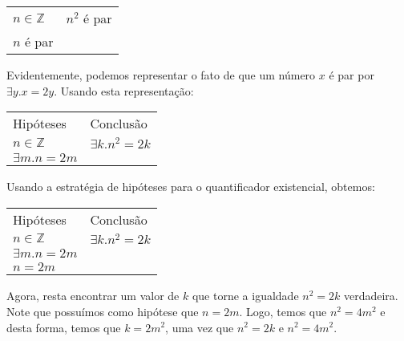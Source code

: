 \begin{Example}
\begin{flushleft}
\begin{tabular}{ll}
$n\in\mathbb{Z}$ & $n^2$ é par\\
$n$ é par  & \\
\end{tabular}
\end{flushleft}
Evidentemente, podemos representar o fato de que um número $x$ é par
por $\exists y. x = 2y$. Usando esta representação:
\begin{flushleft}
\begin{tabular}{ll}
Hipóteses & Conclusão \\
$n\in\mathbb{Z}$ & $\exists k . n^2 = 2k$ \\
$\exists m. n = 2m$  & \\
\end{tabular}
\end{flushleft}
Usando a estratégia de hipóteses para o quantificador existencial,
obtemos:
\begin{flushleft}
\begin{tabular}{ll}
Hipóteses & Conclusão \\
$n\in\mathbb{Z}$ & $\exists k . n^2 = 2k$ \\
$\exists m. n = 2m$  & \\
$n = 2m$ &
\end{tabular}
\end{flushleft}
Agora, resta encontrar um valor de $k$ que torne a igualdade $n^2 =
2k$ verdadeira. Note que possuímos como hipótese que $n = 2m$. Logo,
temos que $n^2 = 4m^2$ e desta forma, temos que $k = 2m^2$, uma vez
que $n^2 = 2k$ e $n^2 = 4m^2$.


\end{Example}
